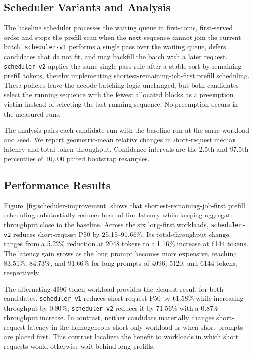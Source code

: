 \documentclass[conference]{IEEEtran}
\begin{document}
\subsection{Scheduler Variants and Analysis}

The baseline scheduler processes the waiting queue in first-come,
first-served order and stops the prefill scan when the next sequence cannot
join the current batch. \texttt{scheduler-v1} performs a single pass over the
waiting queue, defers candidates that do not fit, and may backfill the batch
with a later request. \texttt{scheduler-v2} applies the same single-pass rule
after a stable sort by remaining prefill tokens, thereby implementing
shortest-remaining-job-first prefill scheduling. These policies leave the
decode batching logic unchanged, but both candidates select the running
sequence with the fewest allocated blocks as a preemption victim instead of
selecting the last running sequence. No preemption occurs in the measured
runs.

The analysis pairs each candidate run with the baseline run at the same
workload and seed. We report geometric-mean relative changes in
short-request median latency and total-token throughput. Confidence intervals
are the 2.5th and 97.5th percentiles of 10,000 paired bootstrap resamples.

\subsection{Performance Results}

Figure~\ref{fig:scheduler-improvement} shows that shortest-remaining-job-first
prefill scheduling substantially reduces head-of-line latency while keeping
aggregate throughput close to the baseline. Across the six long-first
workloads, \texttt{scheduler-v2} reduces short-request P50 by 25.15--91.66\%.
Its total-throughput change ranges from a 5.22\% reduction at 2048 tokens to a
1.16\% increase at 6144 tokens. The latency gain grows as the long prompt
becomes more expensive, reaching 83.51\%, 84.73\%, and 91.66\% for long prompts
of 4096, 5120, and 6144 tokens, respectively.

The alternating 4096-token workload provides the clearest result for both
candidates. \texttt{scheduler-v1} reduces short-request P50 by 61.58\% while
increasing throughput by 0.80\%; \texttt{scheduler-v2} reduces it by 71.56\%
with a 0.87\% throughput increase. In contrast, neither candidate materially
changes short-request latency in the homogeneous short-only workload or when
short prompts are placed first. This contrast localizes the benefit to
workloads in which short requests would otherwise wait behind long prefills.
\end{document}
